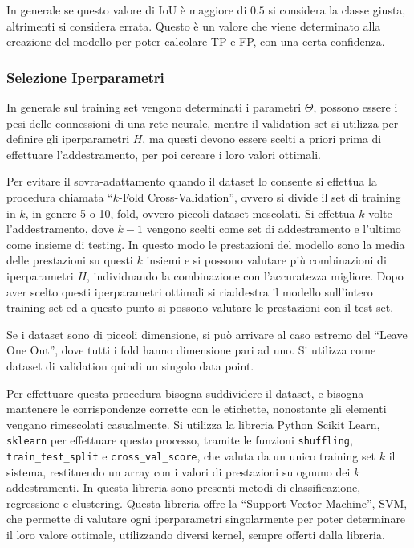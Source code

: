 \documentclass{article}
\numberwithin{equation}{subsection}
\begin{document}
In generale se questo valore di IoU è maggiore di $0.5$ si considera la classe giusta, altrimenti si considera errata. Questo è un valore che viene determinato alla creazione del modello per poter calcolare TP e FP, con una certa confidenza. 

\subsubsection{Selezione Iperparametri}

In generale sul training set vengono determinati i parametri $\Theta$, possono essere i pesi delle connessioni di una rete neurale, mentre il validation set si utilizza per definire 
gli iperparametri $H$, ma questi devono essere scelti a priori prima di effettuare l'addestramento, per poi cercare i loro valori ottimali. 

Per evitare il sovra-adattamento quando il dataset lo consente si effettua la procedura chiamata ``$k$-Fold Cross-Validation'', ovvero si divide il set di training in $k$, in genere 5 o 10, fold, ovvero piccoli dataset mescolati. Si effettua $k$ volte l'addestramento, dove $k-1$ vengono scelti come set di addestramento e l'ultimo come insieme di testing. In questo modo le prestazioni del modello sono la media delle prestazioni su questi $k$ insiemi e si possono 
valutare più combinazioni di iperparametri $H$, individuando la combinazione con l'accuratezza migliore. Dopo aver scelto questi iperparametri ottimali si riaddestra il modello sull'intero training set ed a questo punto si possono valutare le prestazioni con il test set. 

Se i dataset sono di piccoli dimensione, si può arrivare al caso estremo del ``Leave One Out'', dove tutti i fold hanno dimensione pari ad uno. Si utilizza come dataset di validation quindi un singolo data point. 

Per effettuare questa procedura bisogna suddividere il dataset, e bisogna mantenere le corrispondenze corrette con le etichette, nonostante gli elementi vengano rimescolati casualmente. 
Si utilizza la libreria Python Scikit Learn, \verb|sklearn| per effettuare questo processo, tramite le funzioni \verb|shuffling|, \verb|train_test_split| e \verb|cross_val_score|, che valuta da un unico training set $k$ il sistema, restituendo un array con i valori di prestazioni su ognuno dei $k$ addestramenti. 
In questa libreria sono presenti metodi di classificazione, regressione e clustering. 
Questa libreria offre la ``Support Vector Machine'', SVM, che permette di valutare ogni iperparametri singolarmente per poter determinare il loro valore ottimale, utilizzando diversi kernel, sempre offerti dalla libreria. 
\end{document}
